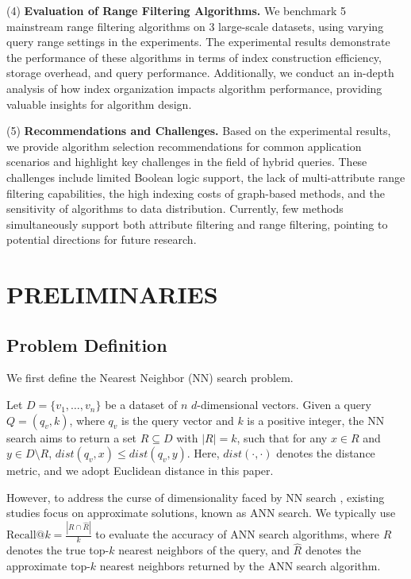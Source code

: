 \documentclass[sigconf, nonacm]{acmart}
\begin{document}
	(4)\textbf{ Evaluation of Range Filtering Algorithms.}
	We benchmark 5 mainstream range filtering algorithms on 3 large-scale datasets, using varying query range settings in the experiments. The experimental results demonstrate the performance of these algorithms in terms of index construction efficiency, storage overhead, and query performance. Additionally, we conduct an in-depth analysis of how index organization impacts algorithm performance, providing valuable insights for algorithm design.
	
	
	(5)\textbf{ Recommendations and Challenges.}
	Based on the experimental results, we provide algorithm selection recommendations for common application scenarios and highlight key challenges in the field of hybrid queries. These challenges include limited Boolean logic support, the lack of multi-attribute range filtering capabilities, the high indexing costs of graph-based methods, and the sensitivity of algorithms to data distribution. Currently, few methods simultaneously support both attribute filtering and range filtering, pointing to potential directions for future research.
	
	\section{PRELIMINARIES}
	
	\subsection{Problem Definition}
	
	We first define the Nearest Neighbor (NN) search problem.
	
	\begin{definition}[NN Search]
		
		Let \( D = \{v_1, \ldots, v_n\} \) be a dataset of \( n \) \( d \)-dimensional vectors. Given a query \( Q = (q_v, k) \), where \( q_v \) is the query vector and \( k \) is a positive integer, the NN search aims to return a set \( R \subseteq D \) with \( |R| = k \), such that for any \( x \in R \) and \( y \in D \setminus R \), \( \textit{dist}\!\left(q_v, x\right) \leq \textit{dist}\!\left(q_v, y\right) \). Here, \( \textit{dist}\!\left(\cdot, \cdot\right) \) denotes the distance metric, and we adopt Euclidean distance in this paper.
	\end{definition}
	
	However, to address the curse of dimensionality faced by NN search \cite{dimcurse}, existing studies focus on approximate solutions, known as ANN  search. We typically use $\text{Recall}@k = \frac{|R \cap \hat{R}|}{k}$ to evaluate the accuracy of ANN search algorithms, where $R$ denotes the true top-$k$ nearest neighbors of the query, and $\hat{R}$ denotes the approximate top-$k$ nearest neighbors returned by the ANN search algorithm.
	
\end{document}
